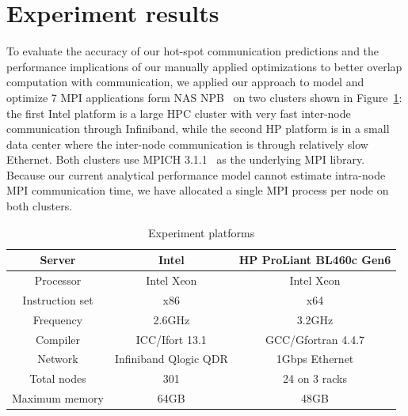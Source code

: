 
\section{Experiment results}
\label{sec-exp}
To evaluate the accuracy of our hot-spot communication predictions
  and the performance implications of our manually applied optimizations to better overlap computation with communication,
we applied our approach to model and optimize 7 MPI applications form NAS NPB~\cite{npb}
  on two clusters shown in Figure~\ref{tab:hw}:
the first Intel platform is a large HPC cluster with very fast inter-node communication through Infiniband,
  while the second HP platform is in a small data center where the inter-node communication is through relatively slow Ethernet.
Both clusters use MPICH 3.1.1~\cite{mpich2} as the underlying MPI library.
Because our current analytical performance model cannot estimate intra-node MPI communication time,
  we have allocated a single MPI process per node on both clusters.
\begin{table}
\begin{center}
\begin{tabular}{c|c c}
\hline
Server & Intel & HP ProLiant BL460c Gen6 \\
\hline
Processor &  Intel Xeon & Intel Xeon \\
Instruction set  &  x86 & x64 \\
Frequency &  2.6GHz & 3.2GHz \\
Compiler  &  ICC/Ifort 13.1 & GCC/Gfortran 4.4.7 \\
Network   &  Infiniband Qlogic QDR & 1Gbps Ethernet \\
Total nodes &  301 & 24 on 3 racks\\
Maximum memory &  64GB & 48GB \\
\hline
\hline
\end{tabular}
\end{center}
\caption{Experiment platforms}
\label{tab:hw}
\end{table}

